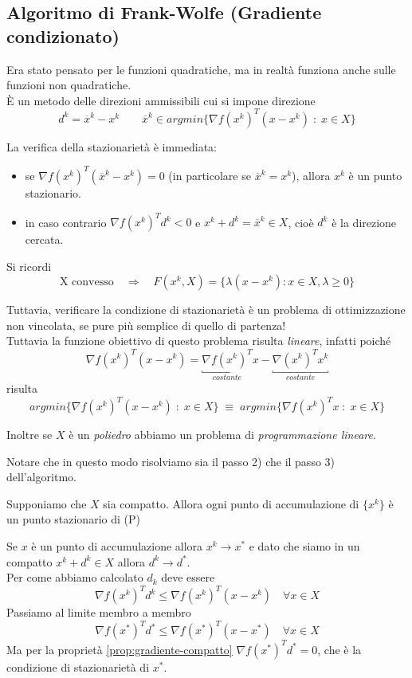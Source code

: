 \subsection{Algoritmo di Frank-Wolfe (Gradiente condizionato)}
Era stato pensato per le funzioni quadratiche, ma in realt\`a funziona
anche sulle funzioni non quadratiche. \\
\`E un metodo delle direzioni ammissibili cui si impone direzione
$$ d^{k} = \overline{x}^{k} - x^{k} \qquad 
\overline{x}^{k} \in argmin \{\nabla f(x^{k})^{T}(x -x^{k}) \; : \; x \in X \}
$$

La verifica della stazionariet\`a \`e immediata:
\begin{itemize}
\item se $\nabla f(x^{k})^{T}(\overline{x}^{k} - x^{k})=0$ (in
  particolare se $\overline{x}^{k}=x^{k}$), allora $x^{k}$ \`e
  un punto stazionario. 
\item in caso contrario
  $\nabla f(x^{k})^{T}d^{k} < 0$ e $x^{k} + d^{k} = \overline{x}^{k} \in X$, 
  cio\`e $d^{k}$ \`e la direzione cercata.
\end{itemize}
\begin{notes}
Si ricordi
$$ \text{X convesso} \quad \Rightarrow \quad 
F(x^{k}, X) = \{ \lambda (x - x^{k}) : x \in X, \lambda \geq 0 \} $$
\end{notes}

Tuttavia, verificare la condizione di stazionarietà \`e un problema di ottimizzazione non vincolata, se pure più semplice di quello di partenza!\\ 
Tuttavia la funzione obiettivo di questo problema risulta \emph{lineare},
infatti poiché 
$$ \nabla f(x^{k})^{T} (x-x^k) = \underbracket{\nabla f(x^{k})^{T}}_{costante} x -
\underbracket{\nabla (x^{k})^{T}x^k}_{costante} $$ 
risulta
$$ argmin \{\nabla f(x^{k})^{T}(x -x^{k}) \; : \; x \in X \} \;\equiv\;
   argmin \{\nabla f(x^{k})^{T}x \; : \; x \in X \} $$

Inoltre se $X$ \`e un \emph{poliedro} abbiamo un problema di 
\emph{programmazione lineare}.

Notare che in questo modo risolviamo sia il passo 2) che il passo 3) dell'algoritmo.


\begin{theo}[Convergenza]
  Supponiamo che $X$ sia compatto. Allora ogni punto
  di accumulazione di $\{x^{k}\}$ \`e un punto stazionario di (P)
\end{theo}
\begin{thproof}
  Se $x$ è un punto di accumulazione allora $x^k \rightarrow x^{*}$ e
  dato che siamo in un compatto $x^k + d^k \in X$ allora $d^k
  \rightarrow d^{*}$.\\
  Per come abbiamo calcolato $d_k$ deve essere
  $$ \nabla f(x^{k})^{T} d^k \leq \nabla f(x^{k})^{T} (x -x^{k})
  \quad \forall x \in X$$
  Passiamo al limite membro a membro
  $$ \nabla f(x^{*})^{T} d^{*}
  \leq \nabla f(x^{*})^{T}(x-x^{*}) \quad \forall x \in X$$
  Ma per la propriet\`a \ref{prop:gradiente-compatto} $\nabla
  f(x^{*})^{T} d^{*} = 0$, che è la condizione di stazionariet\`a di $x^{*}$.
\end{thproof}

